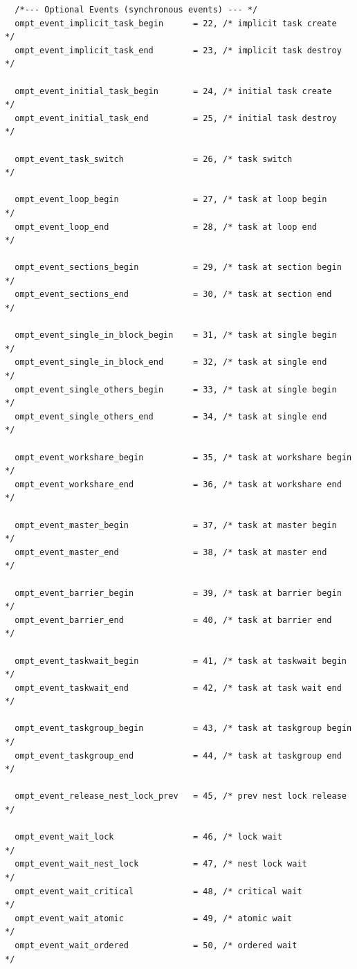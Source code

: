 \documentclass{article}
\begin{document}
{\begin{verbatim}
  /*--- Optional Events (synchronous events) --- */        	    
  ompt_event_implicit_task_begin      = 22, /* implicit task create       */
  ompt_event_implicit_task_end        = 23, /* implicit task destroy      */
  
  ompt_event_initial_task_begin       = 24, /* initial task create        */
  ompt_event_initial_task_end         = 25, /* initial task destroy       */
				    
  ompt_event_task_switch              = 26, /* task switch                */
				    				    
  ompt_event_loop_begin               = 27, /* task at loop begin         */
  ompt_event_loop_end                 = 28, /* task at loop end           */
  
  ompt_event_sections_begin           = 29, /* task at section begin      */
  ompt_event_sections_end             = 30, /* task at section end        */
  
  ompt_event_single_in_block_begin    = 31, /* task at single begin       */
  ompt_event_single_in_block_end      = 32, /* task at single end         */
  ompt_event_single_others_begin      = 33, /* task at single begin       */
  ompt_event_single_others_end        = 34, /* task at single end         */
	
  ompt_event_workshare_begin          = 35, /* task at workshare begin    */		              	 			    
  ompt_event_workshare_end            = 36, /* task at workshare end      */	
	              	 			    
  ompt_event_master_begin             = 37, /* task at master begin       */
  ompt_event_master_end               = 38, /* task at master end         */
  
  ompt_event_barrier_begin            = 39, /* task at barrier begin      */
  ompt_event_barrier_end              = 40, /* task at barrier end        */
  
  ompt_event_taskwait_begin           = 41, /* task at taskwait begin     */
  ompt_event_taskwait_end             = 42, /* task at task wait end      */
  
  ompt_event_taskgroup_begin          = 43, /* task at taskgroup begin    */
  ompt_event_taskgroup_end            = 44, /* task at taskgroup end      */

  ompt_event_release_nest_lock_prev   = 45, /* prev nest lock release     */
								    
  ompt_event_wait_lock                = 46, /* lock wait                  */
  ompt_event_wait_nest_lock           = 47, /* nest lock wait             */
  ompt_event_wait_critical            = 48, /* critical wait              */
  ompt_event_wait_atomic              = 49, /* atomic wait                */
  ompt_event_wait_ordered             = 50, /* ordered wait               */
		 	            				    	    

\end{verbatim}}
\end{document}
